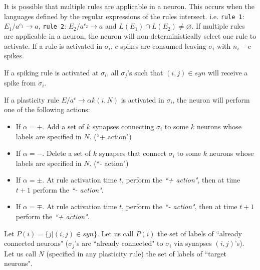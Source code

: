 \documentclass[smallextended]{svjour3}
\begin{document}
It is possible that multiple rules are applicable in a neuron. This occurs when the languages defined by the regular expressions of the rules 
intersect. i.e. \texttt{rule 1}: $E_1/a^{c_1} \rightarrow a$, \texttt{rule 2}: $E_2/a^{c_2} \rightarrow a$ and $L(E_1) \cap L(E_2) \neq \varnothing$. 
If multiple rules are applicable in a neuron, the neuron will non-deterministically select one rule to activate. If a rule is activated in $\sigma_i$,
$c$ spikes are consumed leaving $\sigma_i$ with $n_i-c$ spikes.
  
If a spiking rule is activated at $\sigma_i$, all $\sigma_j$'s such that $(i,j) \in syn$ will receive a spike from $\sigma_i$.
  
If a plasticity rule $E/a^c \rightarrow \alpha k(i, {N})$ is activated in $\sigma_i$, the neuron will perform one of the following actions:
\begin{itemize}
   \item If $\alpha = +$. Add a set of $k$ synapses connecting $\sigma_i$ to some $k$ neurons whose labels are specified in $N$. (``+ action")
   \item If $\alpha = -$. Delete a set of $k$ synapses that connect $\sigma_i$ to some $k$ neurons whose labels are specified in $N$. (``- action")
   \item If $\alpha = \pm$. At rule activation time $t$, perform the \textit{``+ action"}, then at time $t+1$ perform the \textit{``- action"}.
   \item If $\alpha = \mp$. At rule activation time $t$, perform the \textit{``- action"}, then at time $t+1$ perform the \textit{``+ action"}.
\end{itemize}
  
Let $P(i) = \{j|(i,j)\in syn\}$. Let us call $P(i)$ the set of labels of ``already connected neurons" ($\sigma_j$'s are ``already connected" to 
$\sigma_i$ via synapses $(i,j)$'s). Let us call $N$ (specified in any plasticity rule) the set of labels of ``target neurons".
\end{document}
